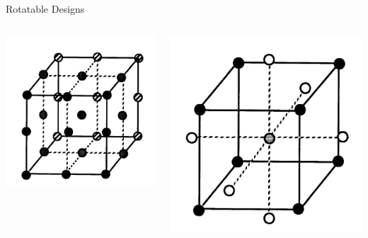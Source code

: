 \documentclass[14pt]{beamer}
\begin{document}
\begin{frame}{Rotatable Designs}
\begin{columns}
    \begin{column}{0.5\textwidth}
      \includegraphics[width=1.1\textwidth]{3level3factor.png}
    \end{column}
    \begin{column}{0.5\textwidth}
      \includegraphics[width=1.1\textwidth]{3level3factorCCI.png}
    \end{column}
  \end{columns}
\end{frame}
\end{document}
